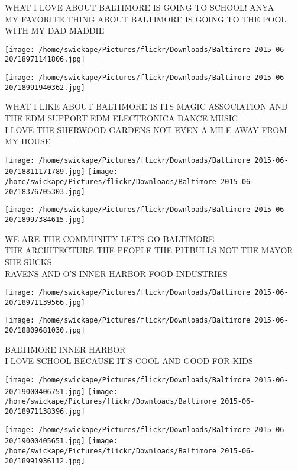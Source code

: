 \documentclass[10pt,letterpaper]{article}
\begin{document}
WHAT I LOVE ABOUT BALTIMORE IS GOING TO SCHOOL!  ANYA\\
MY FAVORITE THING ABOUT BALTIMORE IS GOING TO THE POOL WITH MY DAD MADDIE\\
\pagebreak

\texttt{[image: /home/swickape/Pictures/flickr/Downloads/Baltimore 2015-06-20/18971141806.jpg]}

\vspace{0.25in}
\texttt{[image: /home/swickape/Pictures/flickr/Downloads/Baltimore 2015-06-20/18991940362.jpg]}

WHAT I LIKE ABOUT BALTIMORE IS ITS MAGIC ASSOCIATION AND THE EDM SUPPORT EDM ELECTRONICA DANCE MUSIC\\
I LOVE THE SHERWOOD GARDENS NOT EVEN A MILE AWAY FROM MY HOUSE\\
\pagebreak

\texttt{[image: /home/swickape/Pictures/flickr/Downloads/Baltimore 2015-06-20/18811171789.jpg]}
\texttt{[image: /home/swickape/Pictures/flickr/Downloads/Baltimore 2015-06-20/18376705303.jpg]}

\texttt{[image: /home/swickape/Pictures/flickr/Downloads/Baltimore 2015-06-20/18997384615.jpg]}

WE ARE THE COMMUNITY LET'S GO BALTIMORE\\
THE ARCHITECTURE THE PEOPLE THE PITBULLS NOT THE MAYOR SHE SUCKS\\
RAVENS AND O'S INNER HARBOR FOOD INDUSTRIES\\
\pagebreak

\texttt{[image: /home/swickape/Pictures/flickr/Downloads/Baltimore 2015-06-20/18971139566.jpg]}

\vspace{0.25in}
\texttt{[image: /home/swickape/Pictures/flickr/Downloads/Baltimore 2015-06-20/18809681030.jpg]}

BALTIMORE INNER HARBOR\\
I LOVE SCHOOL BECAUSE IT'S COOL AND GOOD FOR KIDS\\
\pagebreak

\texttt{[image: /home/swickape/Pictures/flickr/Downloads/Baltimore 2015-06-20/19000406751.jpg]}
\texttt{[image: /home/swickape/Pictures/flickr/Downloads/Baltimore 2015-06-20/18971138396.jpg]}

\texttt{[image: /home/swickape/Pictures/flickr/Downloads/Baltimore 2015-06-20/19000405651.jpg]}
\texttt{[image: /home/swickape/Pictures/flickr/Downloads/Baltimore 2015-06-20/18991936112.jpg]}
\end{document}
